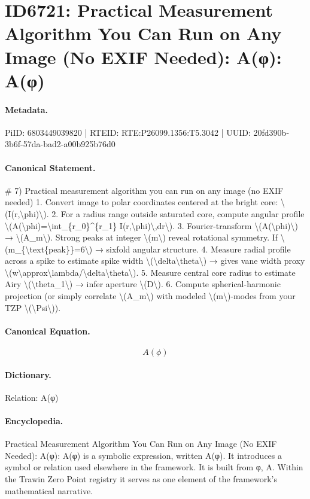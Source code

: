 \section*{ID6721: Practical Measurement Algorithm You Can Run on Any Image (No EXIF Needed): A(φ): A(φ)}
\paragraph{Metadata.}
PiID: 6803449039820 | RTEID: RTE:P26099.1356:T5.3042 | UUID: 20fd390b-3b6f-57da-bad2-a00b925b76d0

\paragraph{Canonical Statement.}
\# 7) Practical measurement algorithm you can run on any image (no EXIF needed) 1. Convert image to polar coordinates centered at the bright core: \textbackslash{}(I(r,\textbackslash{}phi)\textbackslash{}). 2. For a radius range outside saturated core, compute angular profile \textbackslash{}(A(\textbackslash{}phi)=\textbackslash{}int\_\{r\_0\}\textasciicircum{}\{r\_1\} I(r,\textbackslash{}phi)\textbackslash{},dr\textbackslash{}). 3. Fourier-transform \textbackslash{}(A(\textbackslash{}phi)\textbackslash{}) → \textbackslash{}(A\_m\textbackslash{}). Strong peaks at integer \textbackslash{}(m\textbackslash{}) reveal rotational symmetry. If \textbackslash{}(m\_\{\textbackslash{}text\{peak\}\}=6\textbackslash{}) → sixfold angular structure. 4. Measure radial profile across a spike to estimate spike width \textbackslash{}(\textbackslash{}delta\textbackslash{}theta\textbackslash{}) → gives vane width proxy \textbackslash{}(w\textbackslash{}approx\textbackslash{}lambda/\textbackslash{}delta\textbackslash{}theta\textbackslash{}). 5. Measure central core radius to estimate Airy \textbackslash{}(\textbackslash{}theta\_1\textbackslash{}) → infer aperture \textbackslash{}(D\textbackslash{}). 6. Compute spherical-harmonic projection (or simply correlate \textbackslash{}(A\_m\textbackslash{}) with modeled \textbackslash{}(m\textbackslash{})-modes from your TZP \textbackslash{}(\textbackslash{}Psi\textbackslash{})).

\paragraph{Canonical Equation.}
\[
A(\phi)
\]

\paragraph{Dictionary.}
Relation: A(φ)

\paragraph{Encyclopedia.}
Practical Measurement Algorithm You Can Run on Any Image (No EXIF Needed): A(φ): A(φ) is a symbolic expression, written A(φ). It introduces a symbol or relation used elsewhere in the framework. It is built from φ, A. Within the Trawin Zero Point registry it serves as one element of the framework's mathematical narrative.
